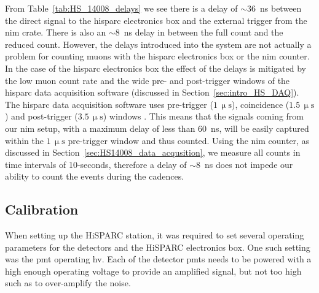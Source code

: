 
From Table~\ref{tab:HS_14008_delays} we see there is a delay of $\sim$36~ns between the direct signal to the \gls{hisparc} electronics box and the external trigger from the \gls{nim} crate. There is also an $\sim$8~ns delay in between the full count and the reduced count. However, the delays introduced into the system are not actually a problem for counting muons with the \gls{hisparc} electronics box or the \gls{nim} counter. In the case of the \gls{hisparc} electronics box the effect of the delays is mitigated by the low muon count rate and the wide pre- and post-trigger windows of the \gls{hisparc} data acquisition software (discussed in Section~\ref{sec:intro_HS_DAQ}). The \gls{hisparc} data acquisition software uses pre-trigger ($1\,\upmu\mathrm{s}$), coincidence ($1.5\,\upmu\mathrm{s}$) and post-trigger ($3.5\,\upmu\mathrm{s}$) windows \citep{fokkema_hisparc_2012}. This means that the signals coming from our \gls{nim} setup, with a maximum delay of less than 60~ns, will be easily captured within the $1\,\upmu\mathrm{s}$ pre-trigger window and thus counted. Using the \gls{nim} counter, as discussed in Section~\ref{sec:HS14008_data_acqusition}, we measure all counts in time intervals of 10-seconds, therefore a delay of $\sim$8~ns does not impede our ability to count the events during the cadences.


\subsection{Calibration}

When setting up the HiSPARC station, it was required to set several operating parameters for the detectors and the HiSPARC electronics box. One such setting was the \gls{pmt} operating \gls{hv}. Each of the detector \glspl{pmt} needs to be powered with a high enough operating voltage to provide an amplified signal, but not too high such as to over-amplify the noise.

